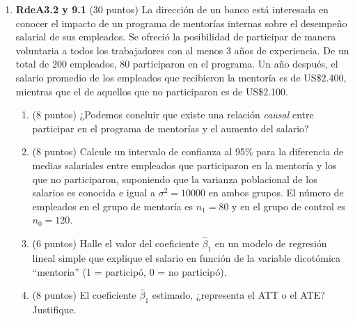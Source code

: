 \documentclass[10pt,a4paper]{article}
\begin{document}
\begin{enumerate}
\begin{itemize}
            Sin considerar habilidad, ¿cuál sería el coeficiente estimado para $\beta$? Y si se incluye habilidad, ¿cómo debería ser el coeficiente estimado para $\beta$?\\

            \end{itemize}
          
        \item \textbf{RdeA3.2 y 9.1} (30 puntos) La dirección de un banco está interesada en conocer el impacto de un programa de mentorías internas sobre el desempeño salarial de sus empleados. 
Se ofreció la posibilidad de participar de manera voluntaria a todos los trabajadores con al menos 3 años de experiencia. 
De un total de 200 empleados, 80 participaron en el programa. 
Un año después, el salario promedio de los empleados que recibieron la mentoría es de US\$2.400, mientras que el de aquellos que no participaron es de US\$2.100.

\begin{enumerate}
    \item (8 puntos) ¿Podemos concluir que existe una relación \textit{causal} entre participar en el programa de mentorías y el aumento del salario? 
  

    \item (8 puntos) Calcule un intervalo de confianza al 95\% para la diferencia de medias salariales entre empleados que participaron en la mentoría y los que no participaron, 
suponiendo que la varianza poblacional de los salarios es conocida e igual a $\sigma^2 = 10000$ en ambos grupos. 
El número de empleados en el grupo de mentoría es $n_1 = 80$ y en el grupo de control es $n_0 = 120$.


 \item (6 puntos) Halle el valor del coeficiente $\hat{\beta}_1$ en un modelo de regresión lineal simple que explique el salario en función de la variable dicotómica 
    ``mentoria'' (1 = participó, 0 = no participó). 
  
  
\item (8 puntos) El coeficiente $\hat{\beta}_1$ estimado, ¿representa el ATT o el ATE? Justifique.
 
\end{enumerate}



\end{enumerate}
\end{document}
